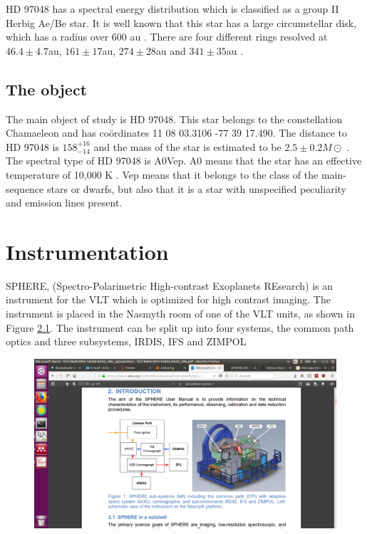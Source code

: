 \documentclass[twoside,single]{lion-msc}
\begin{document}
HD 97048 has a spectral energy distribution which is classified as a group II Herbig Ae/Be star. It is well known that this star has a large circumstellar disk, which has a radius over 600 au \cite{Doering2007}. There are four different rings resolved at $46.4\pm 4.7$au, $161\pm 17$au,	$274\pm 28$au and $341\pm 35$au \cite{Ginski2016}.

\section{The object}
The main object of study is HD 97048. This star belongs to the constellation Chamaeleon and has co\"ordinates 11 08 03.3106 -77 39 17.490. The distance to HD 97048 is $158^{+16}_{-14}$  \cite{VanLeeuwen2007} and the mass of the star is estimated to be $2.5\pm 0.2 M\odot$ \cite{VanDenAncker1998}. The spectral type of HD 97048 is A0Vep. A0 means that the star has an effective temperature of 10,000 K \cite{Maaskant2013}. Vep means that it belongs to the class of the main-sequence stars or dwarfs, but also that it is a star with unspecified peculiarity and emission lines present.
\bigskip

\chapter{Instrumentation}

SPHERE, (Spectro-Polarimetric High-contrast Exoplanets REsearch) is an instrument for the VLT which is optimized for high contrast imaging. The instrument is placed in the Nasmyth room of one of the VLT units, as shown in Figure \ref{Fig:overviewSPHERE}. The instrument can be split up into four systems, the common path optics and three subsystems, IRDIS, IFS and ZIMPOL\\ 

\begin{figure}[htbp]
\centering
\includegraphics[trim={12cm 6cm 7cm 8.8cm},clip,scale = 0.47]{overviewSPHERE}
\caption{} 
\label{Fig:overviewSPHERE}
\end{figure}
\end{document}
